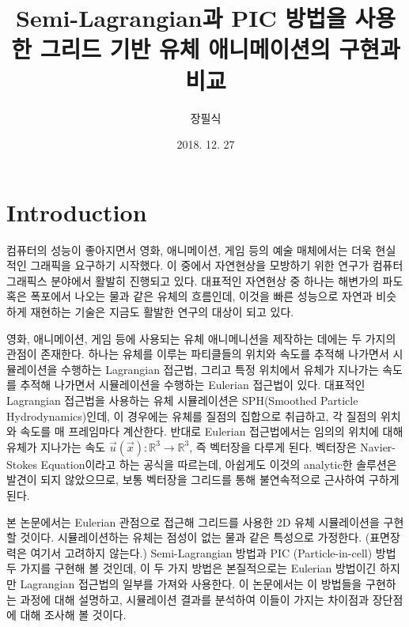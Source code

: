 \documentclass[12pt, A4]{article}
\title{Semi-Lagrangian과 PIC 방법을 사용한 그리드 기반 유체 애니메이션의 구현과 비교}
\author{장필식}
\date{2018. 12. 27}
\begin{document}
\maketitle

\begin{abstract}

\end{abstract}

\newpage

\tableofcontents

\newpage

\section{Introduction}

컴퓨터의 성능이 좋아지면서 영화, 애니메이션, 게임 등의 예술 매체에서는 더욱 현실적인 그래픽을 요구하기 시작했다. 이 중에서 자연현상을 모방하기 위한 연구가 컴퓨터 그래픽스 분야에서 활발히 진행되고 있다. 대표적인 자연현상 중 하나는 해변가의 파도 혹은 폭포에서 나오는 물과 같은 유체의 흐름인데, 이것을 빠른 성능으로 자연과 비슷하게 재현하는 기술은 지금도 활발한 연구의 대상이 되고 있다.

영화, 애니메이션, 게임 등에 사용되는 유체 애니메니션을 제작하는 데에는 두 가지의 관점이 존재한다. 하나는 유체를 이루는 파티클들의 위치와 속도를 추적해 나가면서 시뮬레이션을 수행하는 Lagrangian 접근법, 그리고 특정 위치에서 유체가 지나가는 속도를 추적해 나가면서 시뮬레이션을 수행하는 Eulerian 접근법이 있다. 대표적인 Lagrangian 접근법을 사용하는 유체 시뮬레이션은 SPH(Smoothed Particle Hydrodynamics)인데, 이 경우에는 유체를 질점의 집합으로 취급하고, 각 질점의 위치와 속도를 매 프레임마다 계산한다. 반대로 Eulerian 접근법에서는 임의의 위치에 대해 유체가 지나가는 속도 $\vec{u}(\vec{x}): \mathbb{R}^3 \rightarrow \mathbb{R}^3$, 즉 벡터장을 다루게 된다. 벡터장은 Navier-Stokes Equation이라고 하는 공식을 따르는데, 아쉽게도 이것의 analytic한 솔루션은 발견이 되지 않았으므로, 보통 벡터장을 그리드를 통해 불연속적으로 근사하여 구하게 된다. 

본 논문에서는 Eulerian 관점으로 접근해 그리드를 사용한 2D 유체 시뮬레이션을 구현할 것이다. 시뮬레이션하는 유체는 점성이 없는 물과 같은 특성으로 가정한다. (표면장력은 여기서 고려하지 않는다.) Semi-Lagrangian 방법과 PIC (Particle-in-cell) 방법 두 가지를 구현해 볼 것인데, 이 두 가지 방법은 본질적으로는 Eulerian 방법이긴 하지만 Lagrangian 접근법의 일부를 가져와 사용한다. 이 논문에서는 이 방법들을 구현하는 과정에 대해 설명하고, 시뮬레이션 결과를 분석하여 이들이 가지는 차이점과 장단점에 대해 조사해 볼 것이다.
\end{document}
